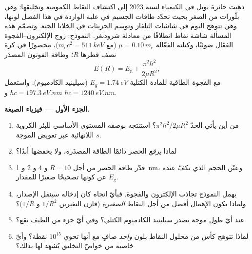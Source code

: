 \begin{problem}\label{pb:b3:schrodinger-three-dimensions:1}
ذهبت جائزة نوبل في الكيمياء لسنة 2023 إلى اكتشاف النقاط الكمومية
وتخليقها: وهي بلّورات من الصغر بحيث تحدّد طاقات الجسيم في علبة
الواردة في هذا الفصل لونها، وهي تتوهج اليوم في شاشات التلفاز
وتوسم الجزيئات في الخلايا الحية. وتصمّم هذه المسألة
شاشة نقاط انطلاقًا من معادلة شرودنغر. النموذج: زوج
الإلكترون--الفجوة الفعّال ضوئيًا، وكتلته الفعّالة $\mu = 0.10\,m_{\text{e}}$
(مع $m_{\text{e}}c^2 = \qty{511}{keV}$)، محصورًا في كرة نصف قطرها
$R$؛ وطاقة الفوتون المصدَر
\[
E(R) = E_{\text{g}} + \frac{\pi^2\hbar^2}{2\mu R^2} ,
\]
مع الفجوة الطاقية للمادة الكتلية $E_{\text{g}} = \qty{1.74}{eV}$ (سيلينيد
الكادميوم). واستعمل $\hbar c = \qty{197.3}{eV.nm}$ و $hc =
\qty{1240}{eV.nm}$.

\medskip\noindent\textbf{الجزء الأول --- فيزياء الصيغة.}
\begin{enumerate}
  \item من أين يأتي الحدّ $\pi^2\hbar^2/2\mu R^2$؟ استنتجه
        بوصفه المستوي الأساسي للبئر الكروية اللانهائية عبر
        تعويض الموجة $s$.
  \item لماذا \emph{يرفع} الحصر دائمًا الطاقة المصدَرة،
        ولا يخفضها أبدًا؟
  \item قدّر طاقة الحصر من أجل $R = 10$ و $4$ و $2$ و
        \qty{1}{nm}، وعيّن الحجم الذي تكفّ عنده عن كونها
        تصحيحًا صغيرًا للمقدار $E_{\text{g}}$.
  \item يهمل النموذج تجاذب الإلكترون والفجوة. فبأيّ اتجاه
        كان إدخاله سينقل الإصدار، ولماذا يكون الإهمال أفضل
        من أجل النقاط \emph{الصغيرة} (قارن التغيرين $1/R^2$
        و $1/R$)؟
  \item عند أيّ طول موجة يصدر سيلينيد الكادميوم الكتلي؟ وفي أيّ جزء
        من الطيف يقع؟
  \item لماذا تتوهج كأس من محلول النقاط بلون \emph{واحد}
        صافٍ مع أنها تحوي $10^{15}$ نقطة؟ وأيّ خاصية من خواصّ
        التخليق يُشهَد لها بذلك؟
\end{enumerate}


\end{problem}
